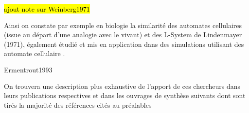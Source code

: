 \hl{ ajout note sur Weinberg1971 }

Ainsi on constate par exemple en biologie la similarité \autocite{Hermann1973, Hogeweg1974, Stauffer1998} des automates cellulaires (issue au départ d'une analogie avec le vivant) et des L-System \autocite{Prusinkiewicz1999} de Lindenmayer (1971), également étudié et mis en application dans des simulations utilisant des automate cellulaire \autocites{Hogeweg1978, Frijters1974}.

Ermentrout1993

On trouvera une description plus exhaustive de l'apport de ces chercheurs dans leurs publications respectives et dans les ouvrages de synthèse suivants dont sont tirés la majorité des références cités au préalables \autocites{Dyson1997,Fogel1998, Sipper1998, Fogel2006a}[46-66]{Taylor1999} 

%









